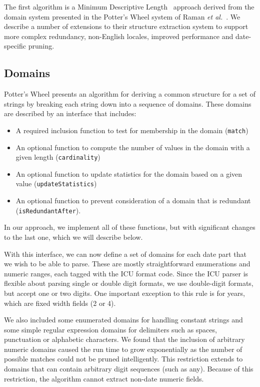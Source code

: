 The first algorithm is a Minimum Descriptive Length~\cite{Rissanen:1978} approach derived from the domain system presented in the Potter's Wheel system of Raman \textit{et al.}~\cite{Raman:2001}. We describe a number of extensions to their structure extraction system to support more complex redundancy, non-English locales, improved performance and date-specific pruning.

\subsection{Domains}
Potter's Wheel presents an algorithm for deriving a common structure for a set of strings by breaking each string down into a sequence of domains. These domains are described by an interface that includes:
\begin{itemize}
\item A required inclusion function to test for membership in the domain (\texttt{match})
\item An optional function to compute the number of values in the domain with a given length (\texttt{cardinality})
\item An optional function to update statistics for the domain based on a given value (\texttt{updateStatistics})
\item An optional function to prevent consideration of a domain that is redundant (\texttt{isRedundantAfter}).
\end{itemize}

In our approach, we implement all of these functions, but with significant changes to the last one, which we will describe below.

With this interface, we can now define a set of domains for each date part that we wish to be able to parse. These are mostly straightforward enumerations and numeric ranges, each tagged with the ICU format code. Since the ICU parser is flexible about parsing single or double digit formats, we use double-digit formats, but accept one or two digits. One important exception to this rule is for years, which are fixed width fields (2 or 4).

We also included some enumerated domains for handling constant strings and some simple regular expression domains for delimiters such as spaces, punctuation or alphabetic characters. We found that the inclusion of arbitrary numeric domains caused the run time to grow exponentially as the number of possible matches could not be pruned intelligently. This restriction extends to domains that can contain arbitrary digit sequences (such as any). Because of this restriction, the algorithm cannot extract non-date numeric fields.


